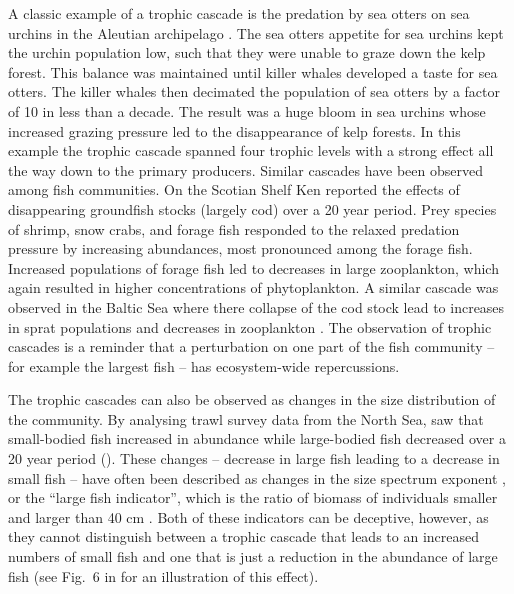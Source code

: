 A classic example of a trophic cascade is the predation by sea otters on sea urchins in the Aleutian archipelago \citep{Estes1998}.  The sea otters appetite for sea urchins kept the urchin population low, such that they were unable to graze down the kelp forest.  This balance was maintained until killer whales developed a taste for sea otters.  The killer whales then decimated the population of sea otters by a factor of 10 in less than a decade.  The result was a huge bloom in sea urchins whose increased grazing pressure led to the disappearance of kelp forests.  In this example the trophic cascade spanned four trophic levels with a strong effect all the way down to the primary producers.  Similar cascades have been observed among fish communities.  On the Scotian Shelf Ken \citet{Frank2005} reported the effects of disappearing groundfish stocks (largely cod) over a 20 year period.  Prey species of shrimp, snow crabs, and forage fish responded to the relaxed predation pressure by increasing abundances, most pronounced among the forage fish.  Increased populations of forage fish led to decreases in large zooplankton, which again resulted in higher concentrations of phytoplankton.  A similar cascade was observed in the Baltic Sea where there collapse of the cod stock lead to increases in sprat populations and decreases in zooplankton \citep{Casini2008}.  The observation of trophic cascades is a reminder that a perturbation on one part of the fish community -- for example the largest fish -- has ecosystem-wide repercussions. 

The trophic cascades can also be observed as changes in the size distribution of the community.  By analysing trawl survey data from the North Sea, \citet{Daan2005} saw that small-bodied fish increased in abundance while large-bodied fish decreased over a 20 year period ().   These changes -- decrease in large fish leading to a decrease in small fish -- have often been described as changes in the size spectrum exponent \citep{Rice1996, Bianchi2000, Daan2005}, or the ``large fish indicator'', which is the ratio of biomass of individuals smaller and larger than 40 cm \citep{Greenstreet2010, Blanchard2014}.  Both of these indicators can be deceptive, however, as they cannot distinguish between a trophic cascade that leads to an increased numbers of small fish and one that is just a reduction in the abundance of large fish (see Fig.~6 in \citet{Andersen2010} for an illustration of this effect). 

